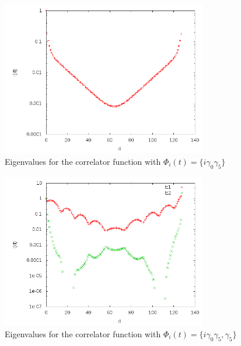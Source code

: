 \documentclass[a4paper,12pt]{report}
\begin{document}
\begin{figure}
\centering
	\includegraphics[width=0.8\textwidth] {images/Maths_Project_iG0G5}
\caption{Eigenvalues for the correlator function with $\Phi_i(t) = \{i\gamma_0\gamma_5\}$}
\end{figure}

\begin{figure}
\centering
	\includegraphics[width=0.8\textwidth] {images/Maths_Project_iG0G5_G5}
\caption{Eigenvalues for the correlator function with $\Phi_i(t) = \{i\gamma_0\gamma_5, \gamma_5\}$}\label{fig:iG0G5_G5}
\end{figure}




\end{document}
